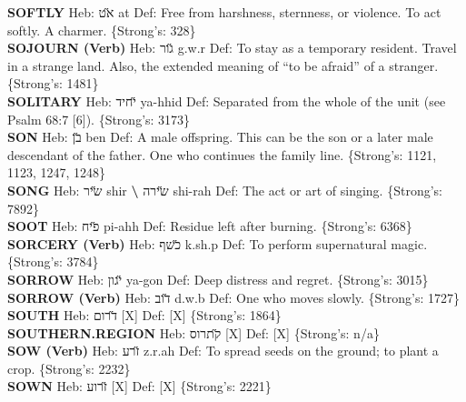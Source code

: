 {\textbf{SOFTLY} Heb: {\large\H אט} at Def: Free from harshness, sternness, or violence. To act softly. A charmer. \{Strong's: 328\}\hfill{}\\

\textbf{SOJOURN (Verb)} Heb: {\large\H גור} g.w.r Def: To stay as a temporary resident. Travel in a strange land. Also, the extended meaning of ``to be afraid'' of a stranger. \{Strong's: 1481\}\hfill{}\\

\textbf{SOLITARY} Heb: {\large\H יחיד} ya-hhid Def: Separated from the whole of the unit (see Psalm 68:7 {[}6{]}). \{Strong's: 3173\}\hfill{}\\

\textbf{SON} Heb: {\large\H בן} ben Def: A male offspring. This can be the son or a later male descendant of the father. One who continues the family line. \{Strong's: 1121, 1123, 1247, 1248\}\hfill{}\\

\textbf{SONG} Heb: {\large\H שיר} shir \textbf{\textbackslash{}} {\large\H שירה} shi-rah Def: The act or art of singing. \{Strong's: 7892\}\hfill{}\\

\textbf{SOOT} Heb: {\large\H פיח} pi-ahh Def: Residue left after burning. \{Strong's: 6368\}\hfill{}\\

\textbf{SORCERY (Verb)} Heb: {\large\H כשף} k.sh.p Def: To perform supernatural magic. \{Strong's: 3784\}\hfill{}\\

\textbf{SORROW} Heb: {\large\H יגון} ya-gon Def: Deep distress and regret. \{Strong's: 3015\}\hfill{}\\

\textbf{SORROW (Verb)} Heb: {\large\H דוב} d.w.b Def: One who moves slowly. \{Strong's: 1727\}\hfill{}\\

\textbf{SOUTH} Heb: {\large\H דרום} {[}X{]} Def: {[}X{]} \{Strong's: 1864\}\hfill{}\\

\textbf{SOUTHERN.REGION} Heb: {\large\H קתרוס} {[}X{]} Def: {[}X{]} \{Strong's: n/a\}\hfill{}\\

\textbf{SOW (Verb)} Heb: {\large\H זרע} z.r.ah Def: To spread seeds on the ground; to plant a crop. \{Strong's: 2232\}\hfill{}\\

\textbf{SOWN} Heb: {\large\H זרוע} {[}X{]} Def: {[}X{]} \{Strong's: 2221\}\hfill{}\\

}
